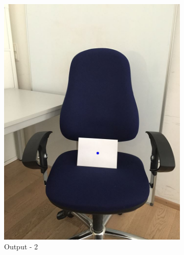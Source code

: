 \documentclass[paper=a4, fontsize=10pt]{scrartcl} %
\numberwithin{equation}{section} %
\numberwithin{figure}{section} %
\begin{document}
\begin{figure}[!ht]
\begin{subfigure}[b]{0.25\textwidth}
		\includegraphics[width=\textwidth]{output_02}
		\caption{Output - 2}
		\label{fig:output_02}
	\end{subfigure}
	~ 
	\begin{subfigure}[b]{0.25\textwidth}

\end{subfigure}
\end{figure}
\end{document}
